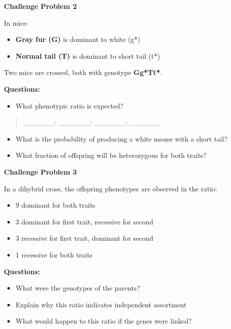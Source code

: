 \documentclass[
  letterpaper,
  DIV=11,
  numbers=noendperiod]{scrreprt}
\providecommand{\tightlist}{%
  \setlength{\itemsep}{0pt}\setlength{\parskip}{0pt}}
\begin{document}
\textbf{Challenge Problem 2}

In mice:

\begin{itemize}
\item
  \textbf{Gray fur (G)} is dominant to white (g*)
\item
  \textbf{Normal tail (T)} is dominant to short tail (t*)
\end{itemize}

Two mice are crossed, both with genotype \textbf{Gg*Tt*}.

\textbf{Questions:}

\begin{itemize}
\tightlist
\item
  What phenotypic ratio is expected?
\end{itemize}

\begin{quote}
\_\_\_\_\_\_: \_\_\_\_\_\_: \_\_\_\_\_\_: \_\_\_\_\_\_
\end{quote}

\begin{itemize}
\item
  What is the probability of producing a white mouse with a short tail?
\item
  What fraction of offspring will be heterozygous for both traits?
\end{itemize}

\textbf{Challenge Problem 3}

In a dihybrid cross, the offspring phenotypes are observed in the ratio:

\begin{itemize}
\item
  9 dominant for both traits
\item
  3 dominant for first trait, recessive for second
\item
  3 recessive for first trait, dominant for second
\item
  1 recessive for both traits
\end{itemize}

\textbf{Questions:}

\begin{itemize}
\item
  What were the genotypes of the parents?
\item
  Explain why this ratio indicates independent assortment
\item
  What would happen to this ratio if the genes were linked?
\end{itemize}
\end{document}
